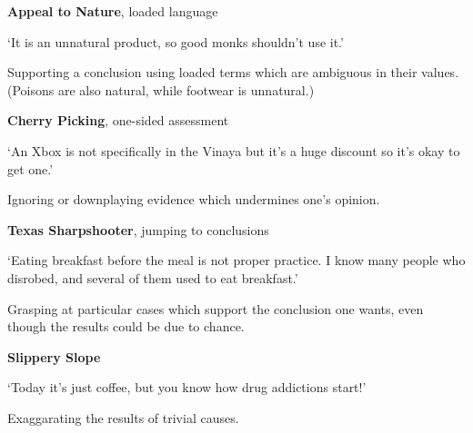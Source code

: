 \textbf{Appeal to Nature}, loaded language

`It is an unnatural product, so good monks shouldn't use it.'

Supporting a conclusion using loaded terms which are ambiguous in their
values. (Poisons are also natural, while footwear is unnatural.)

\textbf{Cherry Picking}, one-sided assessment

`An Xbox is not specifically in the Vinaya but it's a huge discount so
it's okay to get one.'

Ignoring or downplaying evidence which undermines one's opinion.

\textbf{Texas Sharpshooter}, jumping to conclusions

`Eating breakfast before the meal is not proper practice. I know many
people who disrobed, and several of them used to eat breakfast.'

Grasping at particular cases which support the conclusion one wants,
even though the results could be due to chance.

\textbf{Slippery Slope}

`Today it's just coffee, but you know how drug addictions start!'

Exaggarating the results of trivial causes.


